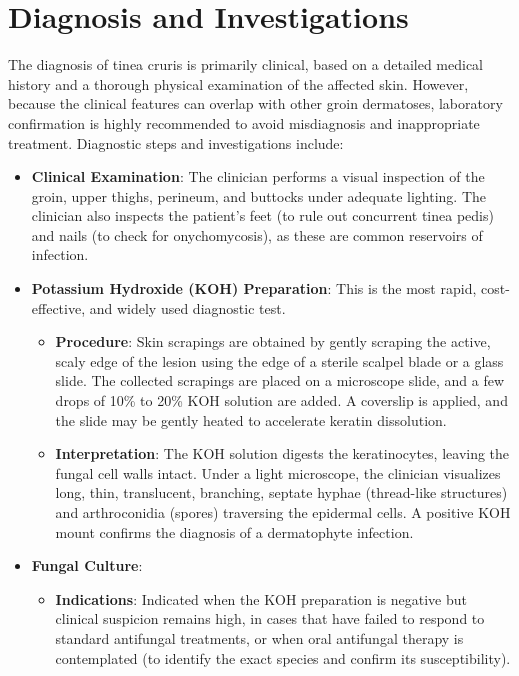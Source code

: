 \section*{Diagnosis and Investigations}
The diagnosis of tinea cruris is primarily clinical, based on a detailed medical history and a thorough physical examination of the affected skin. However, because the clinical features can overlap with other groin dermatoses, laboratory confirmation is highly recommended to avoid misdiagnosis and inappropriate treatment.
Diagnostic steps and investigations include:
\begin{itemize}
    \item \textbf{Clinical Examination}: The clinician performs a visual inspection of the groin, upper thighs, perineum, and buttocks under adequate lighting. The clinician also inspects the patient's feet (to rule out concurrent tinea pedis) and nails (to check for onychomycosis), as these are common reservoirs of infection.
    \item \textbf{Potassium Hydroxide (KOH) Preparation}: This is the most rapid, cost-effective, and widely used diagnostic test.
    \begin{itemize}
        \item \textbf{Procedure}: Skin scrapings are obtained by gently scraping the active, scaly edge of the lesion using the edge of a sterile scalpel blade or a glass slide. The collected scrapings are placed on a microscope slide, and a few drops of 10\% to 20\% KOH solution are added. A coverslip is applied, and the slide may be gently heated to accelerate keratin dissolution.
        \item \textbf{Interpretation}: The KOH solution digests the keratinocytes, leaving the fungal cell walls intact. Under a light microscope, the clinician visualizes long, thin, translucent, branching, septate hyphae (thread-like structures) and arthroconidia (spores) traversing the epidermal cells. A positive KOH mount confirms the diagnosis of a dermatophyte infection.
    \end{itemize}
    \item \textbf{Fungal Culture}:
    \begin{itemize}
        \item \textbf{Indications}: Indicated when the KOH preparation is negative but clinical suspicion remains high, in cases that have failed to respond to standard antifungal treatments, or when oral antifungal therapy is contemplated (to identify the exact species and confirm its susceptibility).

\end{itemize}
\end{itemize}
